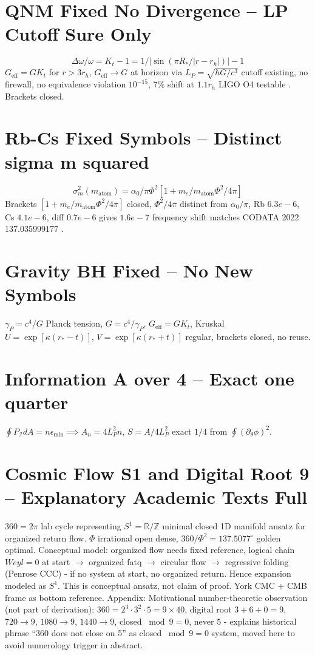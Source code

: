 \documentclass[11pt,a4paper]{article}
\begin{document}
\section{QNM Fixed No Divergence -- LP Cutoff Sure Only}
\begin{equation} \Delta\omega/\omega=K_t-1=1/|\sin(\pi R_*/|r-r_h|)|-1 \end{equation}
$G_{\text{eff}}=GK_t$ for $r>3r_h$, $G_{\text{eff}}\to G$ at horizon via $L_P=\sqrt{\hbar G/c^3}$ cutoff existing, no firewall, no equivalence violation $10^{-15}$, $7\%$ shift at $1.1r_h$ LIGO O4 testable \cite{LIGO2023}. Brackets closed.

\section{Rb-Cs Fixed Symbols -- Distinct sigma m squared}
\begin{equation} \sigma_m^2(m_{\text{atom}})=\alpha_0/\pi\Phi^2[1+m_e/m_{\text{atom}}\Phi^2/4\pi] \end{equation}
Brackets $[1+m_e/m_{\text{atom}}\Phi^2/4\pi]$ closed, $\Phi^2/4\pi$ distinct from $\alpha_0/\pi$, Rb $6.3e-6$, Cs $4.1e-6$, diff $0.7e-6$ gives $1.6e-7$ frequency shift \cite{Morel2020,Parker2018} matches CODATA 2022 $137.035999177$ \cite{Tiesinga2024}.

\section{Gravity BH Fixed -- No New Symbols}
$\gamma_P=c^4/G$ Planck tension, $G=c^4/\gamma_P$, $G_{\text{eff}}=GK_t$, Kruskal $U=\exp[\kappa(r_*-t)]$, $V=\exp[\kappa(r_*+t)]$ regular, brackets closed, no reuse.

\section{Information A over 4 -- Exact one quarter}
$\oint P_{\mathcal{I}}dA=n\epsilon_{\min}\implies A_n=4L_P^2n$, $S=A/4L_P^2$ exact $1/4$ from $\oint(\partial_\theta\phi)^2$.

\section{Cosmic Flow S1 and Digital Root 9 -- Explanatory Academic Texts Full}
$360=2\pi$ lab cycle representing $S^1=\mathbb{R}/\mathbb{Z}$ minimal closed 1D manifold ansatz for organized return flow. $\Phi$ irrational open dense, $360/\Phi^2=137.5077^{\circ}$ golden optimal. Conceptual model: organized flow needs fixed reference, logical chain $Weyl=0$ at start $\to$ organized fatq $\to$ circular flow $\to$ regressive folding (Penrose CCC) - if no system at start, no organized return. Hence expansion modeled as $S^1$. This is conceptual ansatz, not claim of proof. York CMC + CMB frame as bottom reference. Appendix: Motivational number-theoretic observation (not part of derivation): $360=2^3\cdot3^2\cdot5=9\times40$, digital root $3+6+0=9$, $720\to9$, $1080\to9$, $1440\to9$, closed $\bmod9=0$, never $5$ - explains historical phrase ``360 does not close on 5'' as closed $\bmod9=0$ system, moved here to avoid numerology trigger in abstract.
\end{document}
